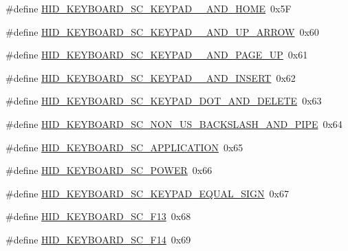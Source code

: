 \begin{DoxyCompactItemize}
\item 
\#define \hyperlink{group__Group__USBClassHIDCommon_ga2d1e7aacaa717463157485663f5e441e}{H\+I\+D\+\_\+\+K\+E\+Y\+B\+O\+A\+R\+D\+\_\+\+S\+C\+\_\+\+K\+E\+Y\+P\+A\+D\+\_\+\_\+\+A\+N\+D\+\_\+\+H\+O\+ME}~0x5F
\item 
\#define \hyperlink{group__Group__USBClassHIDCommon_gadc753c454def599d046887e748488db8}{H\+I\+D\+\_\+\+K\+E\+Y\+B\+O\+A\+R\+D\+\_\+\+S\+C\+\_\+\+K\+E\+Y\+P\+A\+D\+\_\+\_\+\+A\+N\+D\+\_\+\+U\+P\+\_\+\+A\+R\+R\+OW}~0x60
\item 
\#define \hyperlink{group__Group__USBClassHIDCommon_ga54f7982dabdca7e46a189ffce03829f6}{H\+I\+D\+\_\+\+K\+E\+Y\+B\+O\+A\+R\+D\+\_\+\+S\+C\+\_\+\+K\+E\+Y\+P\+A\+D\+\_\+\_\+\+A\+N\+D\+\_\+\+P\+A\+G\+E\+\_\+\+UP}~0x61
\item 
\#define \hyperlink{group__Group__USBClassHIDCommon_gac75444b84014f27206c35bc68dbda042}{H\+I\+D\+\_\+\+K\+E\+Y\+B\+O\+A\+R\+D\+\_\+\+S\+C\+\_\+\+K\+E\+Y\+P\+A\+D\+\_\+\_\+\+A\+N\+D\+\_\+\+I\+N\+S\+E\+RT}~0x62
\item 
\#define \hyperlink{group__Group__USBClassHIDCommon_ga24be07b4186e2298cc0e01697bacb8be}{H\+I\+D\+\_\+\+K\+E\+Y\+B\+O\+A\+R\+D\+\_\+\+S\+C\+\_\+\+K\+E\+Y\+P\+A\+D\+\_\+\+D\+O\+T\+\_\+\+A\+N\+D\+\_\+\+D\+E\+L\+E\+TE}~0x63
\item 
\#define \hyperlink{group__Group__USBClassHIDCommon_gafadaf5783f96ccf7b7044cd8f0b70f12}{H\+I\+D\+\_\+\+K\+E\+Y\+B\+O\+A\+R\+D\+\_\+\+S\+C\+\_\+\+N\+O\+N\+\_\+\+U\+S\+\_\+\+B\+A\+C\+K\+S\+L\+A\+S\+H\+\_\+\+A\+N\+D\+\_\+\+P\+I\+PE}~0x64
\item 
\#define \hyperlink{group__Group__USBClassHIDCommon_ga5f9f5b1720b5f73aca2618ef7ac36093}{H\+I\+D\+\_\+\+K\+E\+Y\+B\+O\+A\+R\+D\+\_\+\+S\+C\+\_\+\+A\+P\+P\+L\+I\+C\+A\+T\+I\+ON}~0x65
\item 
\#define \hyperlink{group__Group__USBClassHIDCommon_ga26e2f48b76b7e26fa590cfe161e2e265}{H\+I\+D\+\_\+\+K\+E\+Y\+B\+O\+A\+R\+D\+\_\+\+S\+C\+\_\+\+P\+O\+W\+ER}~0x66
\item 
\#define \hyperlink{group__Group__USBClassHIDCommon_gad19831a41457e8ce94110b0e21f5f419}{H\+I\+D\+\_\+\+K\+E\+Y\+B\+O\+A\+R\+D\+\_\+\+S\+C\+\_\+\+K\+E\+Y\+P\+A\+D\+\_\+\+E\+Q\+U\+A\+L\+\_\+\+S\+I\+GN}~0x67
\item 
\#define \hyperlink{group__Group__USBClassHIDCommon_gad68d1b31178cc3a09e8f02810627bfc0}{H\+I\+D\+\_\+\+K\+E\+Y\+B\+O\+A\+R\+D\+\_\+\+S\+C\+\_\+\+F13}~0x68
\item 
\#define \hyperlink{group__Group__USBClassHIDCommon_gaecee5dc45c264516387a15de8d568a6f}{H\+I\+D\+\_\+\+K\+E\+Y\+B\+O\+A\+R\+D\+\_\+\+S\+C\+\_\+\+F14}~0x69

\end{DoxyCompactItemize}

